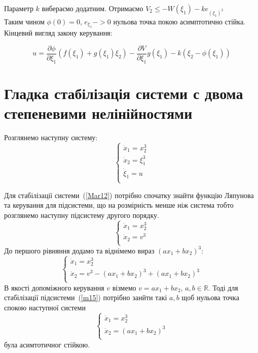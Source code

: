\documentclass{article}
\begin{document}
Параметр $k$ вибераємо додатним.
Отримаємо $V_2 \leq -W(\xi_1) - ke_{(\xi_1)^2}$ \\
Таким чином $\phi(0)=0$, $e_{\xi_1} -> 0$ нульова точка покою асимптотично стійка.
Кінцевий вигляд закону керування:

\begin{equation}
    u = \frac{\partial \phi}{\partial \xi_1}(f(\xi_1)+g(\xi_1)\xi_2)-
    \frac{\partial V}{\partial \xi_1}g(\xi_1)-k(\xi_2-\phi(\xi_1))
\end{equation}
\pagebreak

\section{Гладка стабілізація системи с двома степеневими нелінійностями}
Розглянемо наступну систему:
\begin{equation}\label{Mar12}
    \begin{cases}
    \dot x_1 = x_2^3 \\
    \dot x_2 = \xi_1^3\\
    \dot \xi_1 = u\\
    \end{cases}
\end{equation}

Для стабілізації системи~(\ref{Mar12}) потрібно спочатку знайти функцію Ляпунова
та керування для підсистеми, що на розмірність менше ніж система  тобто розглянемо 
наступну підсистему другого порядку. 
\begin{equation}
    \begin{cases}
    \dot x_1 = x_2^3\\
    \dot x_2 = v^3\\
    \end{cases}
\end{equation}
До першого рівняння додамо та віднімемо вираз $(ax_1+bx_2)^3$:
\begin{equation}\label{m15}
    \begin{cases}
    \dot x_1 = x_{2}^3 \\
    \dot x_2 = v^3 - (ax_1+bx_2)^3 +(ax_1+bx_2)^3 \\
    \end{cases}
\end{equation}
В якості допоміжного керування $v$ візмемо $v=ax_1+bx_2$, $a,b \in \mathbb{R}$. Тоді
для стабілізації підсистеми~(\ref{m15}) потрібно занйти такі  $a,b$ щоб нульова точка спокою 
наступної системи
\begin{equation}
    \begin{cases}
    \dot x_1 =x_{2}^3 \\
    \dot x_2 =(ax_1+bx_2)^3 \\
    \end{cases}
\end{equation}
була асимтотичног стійкою.
\end{document}
